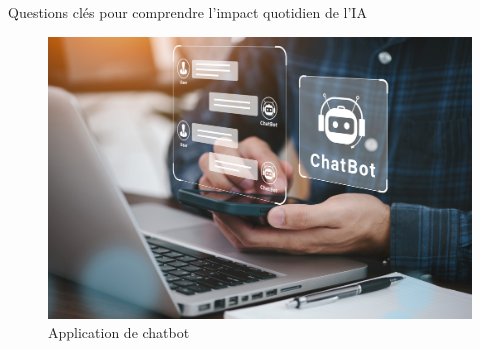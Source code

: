 \documentclass{beamer}
\begin{document}
\begin{frame}{Questions clés pour comprendre l'impact quotidien de l'IA}
\begin{figure}[h]
\begin{minipage}{0.48\textwidth}
			\includegraphics[width=\linewidth]{ChatBot.jpg}
			\caption{Application de chatbot}
		\end{minipage}

	\end{figure}

\end{frame}
\end{document}
